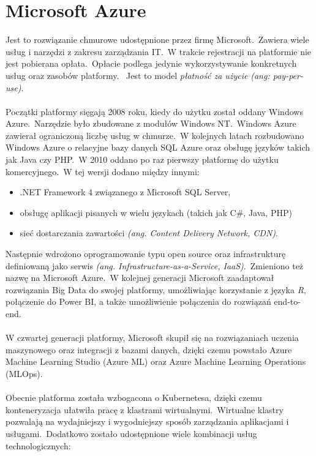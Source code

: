 \chapter{Microsoft Azure}
Jest to rozwiązanie chmurowe udostępnione przez firmę Microsoft.\ Zawiera wiele usług i narzędzi z zakresu zarządzania IT.\ W trakcie rejestracji na platformie nie jest pobierana opłata.\ Opłacie podlega jedynie wykorzystywanie konkretnych usług oraz zasobów platformy. \ Jest to model \textit{płatność za użycie} \textit{(ang: pay-per-use)}.
\\ \\
Początki platformy sięgają 2008 roku, kiedy do użytku został oddany Windows Azure.\ Narzędzie było zbudowane z modułów Windows NT.\ Windows Azure zawierał ograniczoną liczbę usług w chmurze.\ W kolejnych latach rozbudowano Windows Azure o relacyjne bazy danych SQL Azure oraz obsługę języków takich jak Java czy PHP.\ W 2010 oddano po raz pierwszy platformę do użytku komercyjnego.\ W tej wersji dodano między innymi:
\begin{itemize}
\item .NET Framework 4 związanego z Microsoft SQL Server,
\item obsługę aplikacji pisanych w wielu językach (takich jak C\#, Java, PHP)
\item sieć dostarczania zawartości \textit{(ang. Content Delivery Network, CDN)}.
\end{itemize}
Następnie wdrożono oprogramowanie typu open source oraz infrastrukturę definiowaną jako serwis \textit{(ang. Infrastructure-as-a-Service, IaaS)}.\ Zmieniono też nazwę na Microsoft Azure.\ W kolejnej generacji Microsoft zaadaptował rozwiązania Big Data do swojej platformy, umożliwiając korzystanie z języka \textit{R}, połączenie do Power BI, a także umożliwienie połączenia do rozwiązań end-to-end.
\\ \\
W czwartej generacji platformy, Microsoft skupił się na rozwiązaniach uczenia maszynowego oraz integracji z bazami danych, dzięki czemu powstało Azure Machine Learning Studio (Azure ML) oraz Azure Machine Learning Operations (MLOps).
\\ \\
Obecnie platforma została wzbogacona o Kubernetesa, dzięki czemu konteneryzacja ułatwiła pracę z klastrami wirtualnymi.\ Wirtualne klastry pozwalają na wydajniejszy i wygodniejszy sposób zarządzania aplikacjami i usługami.\ Dodatkowo zostało udostępnione wiele kombinacji usług technologicznych:

